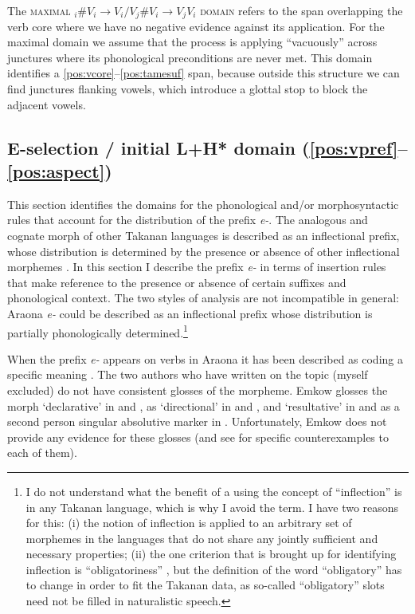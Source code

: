 \documentclass[output=paper,hidelinks]{langscibook}
\begin{document}
The \textsc{maximal ${_i}\#V{_i} \rightarrow V{_i} / V{_j}\#V{_i} \rightarrow V{_j}V{_i}$ domain} refers to the span overlapping the verb core where we have no negative evidence against its application. For the maximal domain we assume that the process is applying ``vacuously'' across junctures where its phonological preconditions are never met. This domain identifies a \ref{pos:vcore}--\ref{pos:tamesuf} span, because outside this structure we can find junctures flanking vowels, which introduce a glottal stop to block the adjacent vowels.

\subsection{E-selection / initial L+H* domain (\ref{pos:vpref}--\ref{pos:aspect})}
\label{sec:e}

This section identifies the domains for the phonological and/or morphosyntactic rules that account for the distribution of the prefix \textit{e-}. The analogous and cognate morph of other Takanan languages is described as an inflectional prefix, whose distribution is determined by the presence or absence of other inflectional morphemes \citep{vuillermet:phd2012, Guillaume2008, guillaume:forthcoming}. In this section I describe the prefix \textit{e-} in terms of insertion rules that make reference to the presence or absence of certain suffixes and phonological context. The two styles of analysis are not incompatible in general: Araona \textit{e-} could be described as an inflectional prefix whose distribution is partially phonologically determined.\footnote{I do not understand what the benefit of a using the concept of ``inflection'' is in any Takanan language, which is why I avoid the term. I have two reasons for this: (i) the notion of inflection is applied to an arbitrary set of morphemes in the languages that do not share any jointly sufficient and necessary properties; (ii) the one criterion that is brought up for identifying inflection is ``obligatoriness'' \citep[179--181]{Guillaume2008}, but the definition of the word ``obligatory'' has to change in order to fit the Takanan data, as so-called ``obligatory'' slots need not be filled in naturalistic speech.}

When the prefix \textit{e-} appears on verbs in Araona it has been described as coding a specific meaning \citep{emkow:2006:araona, emkow:2019:araonarepublish, pitmanpitman1976, pitman:1980:araonasketch}. The two authors who have written on the topic (myself excluded) do not have consistent glosses of the morpheme. Emkow glosses the morph `declarative' in \citet[114, 123]{emkow:2006:araona} and \citet[356, 365]{emkow:2019:araonarepublish}, as `directional' in \citet[106]{emkow:2006:araona} and \citet[272]{emkow:2019:araonarepublish}, and `resultative' in \citet[209]{emkow:2019:araonarepublish} and as a second person singular absolutive marker in \citet[318]{emkow:2019:araonarepublish}. Unfortunately, Emkow does not provide any evidence for these glosses (and see \citealt{tallmangallinate} for specific counterexamples to each of them).
\end{document}
